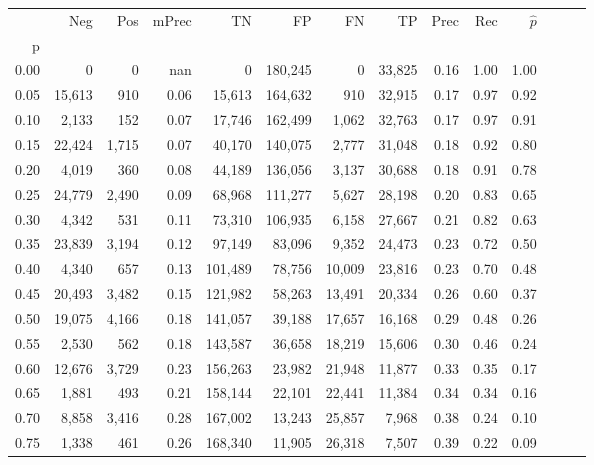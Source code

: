 \begin{tabular}{rrrrrrrrrrrrrr}
\toprule
{} &     Neg &    Pos & mPrec &       TN &       FP &      FN &      TP &  Prec &   Rec & $\hat{p}$ \\
p    &         &        &       &          &          &         &         &       &       &           \\
\midrule
0.00 &       0 &      0 &   nan &        0 &  180,245 &       0 &  33,825 &  0.16 &  1.00 &      1.00 \\
0.05 &  15,613 &    910 &  0.06 &   15,613 &  164,632 &     910 &  32,915 &  0.17 &  0.97 &      0.92 \\
0.10 &   2,133 &    152 &  0.07 &   17,746 &  162,499 &   1,062 &  32,763 &  0.17 &  0.97 &      0.91 \\
0.15 &  22,424 &  1,715 &  0.07 &   40,170 &  140,075 &   2,777 &  31,048 &  0.18 &  0.92 &      0.80 \\
0.20 &   4,019 &    360 &  0.08 &   44,189 &  136,056 &   3,137 &  30,688 &  0.18 &  0.91 &      0.78 \\
0.25 &  24,779 &  2,490 &  0.09 &   68,968 &  111,277 &   5,627 &  28,198 &  0.20 &  0.83 &      0.65 \\
0.30 &   4,342 &    531 &  0.11 &   73,310 &  106,935 &   6,158 &  27,667 &  0.21 &  0.82 &      0.63 \\
0.35 &  23,839 &  3,194 &  0.12 &   97,149 &   83,096 &   9,352 &  24,473 &  0.23 &  0.72 &      0.50 \\
0.40 &   4,340 &    657 &  0.13 &  101,489 &   78,756 &  10,009 &  23,816 &  0.23 &  0.70 &      0.48 \\
0.45 &  20,493 &  3,482 &  0.15 &  121,982 &   58,263 &  13,491 &  20,334 &  0.26 &  0.60 &      0.37 \\
0.50 &  19,075 &  4,166 &  0.18 &  141,057 &   39,188 &  17,657 &  16,168 &  0.29 &  0.48 &      0.26 \\
0.55 &   2,530 &    562 &  0.18 &  143,587 &   36,658 &  18,219 &  15,606 &  0.30 &  0.46 &      0.24 \\
0.60 &  12,676 &  3,729 &  0.23 &  156,263 &   23,982 &  21,948 &  11,877 &  0.33 &  0.35 &      0.17 \\
0.65 &   1,881 &    493 &  0.21 &  158,144 &   22,101 &  22,441 &  11,384 &  0.34 &  0.34 &      0.16 \\
0.70 &   8,858 &  3,416 &  0.28 &  167,002 &   13,243 &  25,857 &   7,968 &  0.38 &  0.24 &      0.10 \\
0.75 &   1,338 &    461 &  0.26 &  168,340 &   11,905 &  26,318 &   7,507 &  0.39 &  0.22 &      0.09 \\

\end{tabular}
